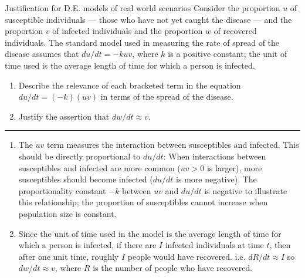 \documentclass[oneside]{book}
\begin{document}
\begin{example}{Justification for D.E. models of real world scenarios}{}
  Consider the proportion \(u\) of susceptible individuals --- those who have not yet caught the disease --- and the proportion \(v\) of infected individuals and the proportion \(w\) of recovered individuals. The standard model used in measuring the rate of spread of the disease assumes that \(du/dt=-kuv\), where \(k\) is a positive constant; the unit of time used is the average length of time for which a person is infected.
  \begin{enumerate}[label=(\alph*)]
    \item Describe the relevance of each bracketed term in the equation \(du/dt=(-k)(uv)\) in terms of the spread of the disease.
    \item Justify the assertion that \(dw/dt\approx v\).
  \end{enumerate}
  \rule{20cm-137.0549pt}{0.05mm} 
  \begin{enumerate}[label=(\alph*)]
    \item The \(uv\) term measures the interaction between susceptibles and infected. This should be directly proportional to \(du/dt\): When interactions between susceptibles and infected are more common (\(uv>0\) is larger), more susceptibles should become infected (\(du/dt\) is more negative). The proportionality constant \(-k\) between \(uv\) and \(du/dt\) is negative to illustrate this relationship; the proportion of susceptibles cannot increase when population size is constant.   
    \item Since the unit of time used in the model is the average length of time for which a person is infected, if there are \(I\) infected individuals at time \(t\), then after one unit time, roughly \(I\) people would have recovered. i.e. \(dR/dt\approx I\) so \(dw/dt\approx v\), where \(R\) is the number of people who have recovered.
  \end{enumerate}
\end{example}
\end{document}
